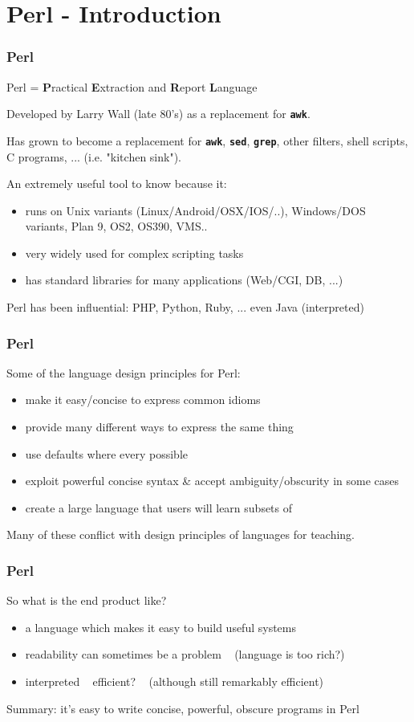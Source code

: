 

\section{Perl - Introduction}

\begin{frame}
\frametitle{Perl}
Perl = {\bf{P}}ractical {\bf{E}}xtraction and {\bf{R}}eport {\bf{L}}anguage

Developed by Larry Wall (late 80's) as a replacement for \textbf{\tt{awk}}.

Has grown to become a replacement for \textbf{\tt{awk}}, \textbf{\tt{sed}},
\textbf{\tt{grep}}, other filters, shell scripts, C programs, ...
(i.e. "kitchen sink").

An extremely useful tool to know because it:
\begin{itemize}
\item  runs on Unix variants (Linux/Android/OSX/IOS/..), Windows/DOS variants, Plan 9, OS2, OS390, VMS..
\item  very widely used for complex scripting tasks 
\item  has standard libraries for many applications (Web/CGI, DB, ...)
\end{itemize}
Perl has been influential: PHP, Python, Ruby, ... even Java {\small (interpreted)}
\end{frame}

\begin{frame}
\frametitle{Perl}
Some of the language design principles for Perl:
\begin{itemize}
\item  make it easy/concise to express common idioms 
\item  provide many different ways to express the same thing
\item  use defaults where every possible
\item  exploit powerful concise syntax \& accept ambiguity/obscurity in some cases
\item  create a large language that users will learn subsets of
\end{itemize}
{\small Many of these conflict with design principles of languages for teaching.}
\end{frame}

\begin{frame}
\frametitle{Perl}
So what is the end product like?
\begin{itemize}
\item  a language which makes it easy to build useful systems
\item  readability can sometimes be a problem ~ {\small (language is too rich?)}
\item  interpreted ~ efficient? ~ {\small (although still remarkably efficient)}
\end{itemize}
Summary: it's easy to write concise, powerful, obscure programs in Perl
\end{frame}

